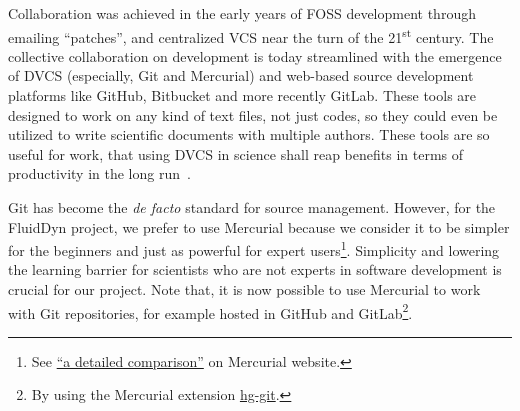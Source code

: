








 Collaboration was achieved in the early years of FOSS
development through emailing ``patches'', and centralized VCS near the turn of
the 21\textsuperscript{st} century.  The collective collaboration on
development is today streamlined with the emergence of DVCS (especially, Git
and Mercurial) and web-based source development platforms like GitHub,
Bitbucket and more recently GitLab.
%
These tools are designed to work on any kind of text files, not just codes, so
they could even be utilized to write scientific documents with multiple authors.
%
These tools are so useful for work, that using DVCS in science shall reap
benefits in terms of productivity in the long run~\cite{wilson_best_2014}.

Git has become the \textit{de facto} standard for source management. However,
for the FluidDyn project, we prefer to use Mercurial because we consider it to
be simpler for the beginners and just as powerful for expert users\footnote{See
\href{https://www.mercurial-scm.org/wiki/GitConcepts}{``a detailed
comparison''} on Mercurial website.}. Simplicity and lowering the learning
barrier for scientists who are not experts in software development is crucial
for our project.
%
Note that, it is now possible to use Mercurial to work with Git repositories,
for example hosted in GitHub and GitLab\footnote{By using the Mercurial
extension \href{http://hg-git.github.io/}{hg-git}.}.

